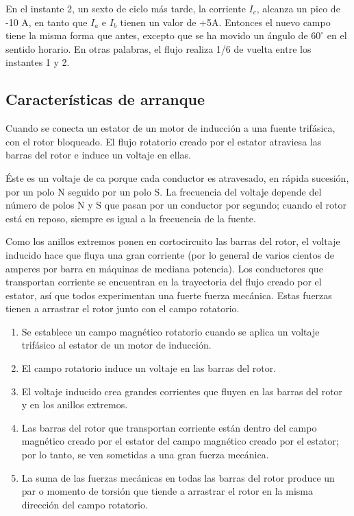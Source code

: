 \documentclass[a4paper,12pt]{article}
\begin{document}
En el instante 2, un sexto de ciclo más tarde, la corriente $I_{c}$, alcanza un pico de -10 A, en tanto que $I_{a}$ e $I_{b}$ tienen un valor de +5A. Entonces el nuevo campo tiene la misma forma que antes, excepto que se ha movido un ángulo de $60^{\circ}$ en el sentido horario. En otras palabras, el flujo realiza 1/6 de vuelta entre los instantes 1 y 2.

\subsection{Características de arranque}

Cuando se conecta un estator de un motor de inducción a una fuente trifásica, con el rotor bloqueado. El flujo rotatorio creado por el estator atraviesa las barras del rotor e induce un voltaje en ellas.

Éste es un voltaje de ca porque cada conductor es atravesado, en rápida sucesión, por un polo N seguido por un polo S. La frecuencia del voltaje depende del número de polos N y S que pasan por un conductor por segundo; cuando el rotor está en reposo, siempre es igual a la frecuencia de la fuente.

Como los anillos extremos ponen en cortocircuito las barras del rotor, el voltaje inducido hace que fluya una gran corriente (por lo general de varios cientos de amperes por barra en máquinas de mediana potencia). Los conductores que transportan corriente se encuentran en la trayectoria del flujo creado por el estator, así que todos experimentan una fuerte fuerza mecánica. Estas fuerzas tienen a arrastrar el rotor junto con el campo rotatorio.

\begin{enumerate}
    \item Se establece un campo magnético rotatorio cuando se aplica un voltaje trifásico al estator de un motor de inducción.
    \item El campo rotatorio induce un voltaje en las barras del rotor.
    \item El voltaje inducido crea grandes corrientes que fluyen en las barras del rotor y en los anillos extremos.
    \item Las barras del rotor que transportan corriente están dentro del campo magnético creado por el estator del campo magnético creado por el estator; por lo tanto, se ven sometidas a una gran fuerza mecánica.
    \item La suma de las fuerzas mecánicas en todas las barras del rotor produce un par o momento de torsión que tiende a arrastrar el rotor en la misma dirección del campo rotatorio.
\end{enumerate}
\end{document}
